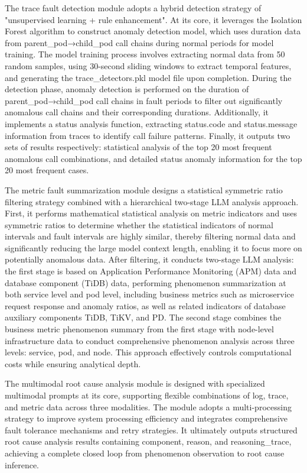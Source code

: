 \documentclass[10pt]{article}
\begin{document}
The trace fault detection module adopts a hybrid detection strategy of "unsupervised learning + rule enhancement". At its core, it leverages the Isolation Forest\cite{liu2008isolation} algorithm to construct anomaly detection model, which uses duration data from parent\_pod→child\_pod call chains during normal periods for model training. The model training process involves extracting normal data from 50 random samples, using 30-second sliding windows to extract temporal features, and generating the trace\_detectors.pkl model file upon completion. During the detection phase, anomaly detection is performed on the duration of parent\_pod→child\_pod call chains in fault periods to filter out significantly anomalous call chains and their corresponding durations. Additionally, it implements a status analysis function, extracting status.code and status.message information from traces to identify call failure patterns. Finally, it outputs two sets of results respectively: statistical analysis of the top 20 most frequent anomalous call combinations, and detailed status anomaly information for the top 20 most frequent cases.

The metric fault summarization module designs a statistical symmetric ratio filtering strategy combined with a hierarchical two-stage LLM analysis approach. First, it performs mathematical statistical analysis on metric indicators and uses symmetric ratios to determine whether the statistical indicators of normal intervals and fault intervals are highly similar, thereby filtering normal data and significantly reducing the large model context length, enabling it to focus more on potentially anomalous data. After filtering, it conducts two-stage LLM analysis: the first stage is based on Application Performance Monitoring (APM) data and database component (TiDB) data, performing phenomenon summarization at both service level and pod level, including business metrics such as microservice request response and anomaly ratios, as well as related indicators of database auxiliary components TiDB, TiKV, and PD. The second stage combines the business metric phenomenon summary from the first stage with node-level infrastructure data to conduct comprehensive phenomenon analysis across three levels: service, pod, and node. This approach effectively controls computational costs while ensuring analytical depth.

The multimodal root cause analysis module is designed with specialized multimodal prompts at its core, supporting flexible combinations of log, trace, and metric data across three modalities. The module adopts a multi-processing strategy to improve system processing efficiency and integrates comprehensive fault tolerance mechanisms and retry strategies. It ultimately outputs structured root cause analysis results containing component, reason, and reasoning\_trace, achieving a complete closed loop from phenomenon observation to root cause inference.
\end{document}
